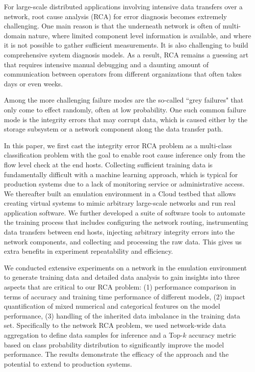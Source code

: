 For large-scale distributed applications involving intensive data transfers over a network, root cause analysis (RCA) for error diagnosis becomes extremely challenging. One main reason is that the underneath network is often of multi-domain nature, where limited component level information is available, and where it is not possible to gather sufficient measurements. It is also challenging to build comprehensive system diagnosis models. As a result, RCA remains a guessing art that requires intensive manual debugging and a daunting amount of communication between operators from different organizations that often takes days or even weeks.  

Among the more challenging failure modes are the so-called ``grey failures" that only come to effect randomly, often at low probability. One such common failure mode is the integrity errors that may corrupt data, which is caused either by the storage subsystem or a network component along the data transfer path. 

In this paper, we first cast the integrity error RCA problem as a multi-class classification problem with the goal to enable root cause inference only from the flow level check at the end hosts. Collecting sufficient training data is fundamentally difficult with a machine learning approach, which is typical for production systems due to a lack of monitoring service or administrative access. We thereafter built an emulation environment in a Cloud testbed that allows creating virtual systems to mimic arbitrary large-scale networks and run real application software. We further developed a suite of software tools to automate the training process that includes configuring the network routing, instrumenting data transfers between end hosts, injecting arbitrary integrity errors into the network components, and collecting and processing the raw data. This gives us extra benefits in experiment repeatability and efficiency. 

We conducted extensive experiments on a network in the emulation environment to generate training data and detailed data analysis to gain insights into three aspects that are critical to our RCA 
problem: (1) performance comparison in terms of accuracy and training time performance of different models, (2) impact quantification of mixed numerical and categorical features on the model performance, 
(3) handling of the inherited data imbalance in the training data set. Specifically to the network RCA problem, we used network-wide data aggregation to define data samples for inference and a Top-$k$ accuracy metric based on class probability distribution to significantly improve the model performance. The results demonstrate the efficacy of the approach and the potential to extend to production systems.  
